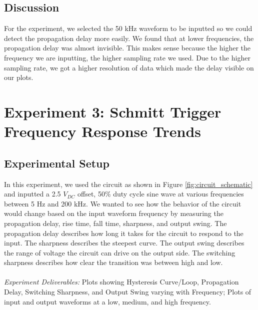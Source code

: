 \documentclass[9pt,a4paper,twoside]{tau-class/tau}
\begin{document}
	\subsection{Discussion}
	For the experiment, we selected the 50 kHz waveform to be inputted so we could detect the propagation delay more easily. We found that at lower frequencies, the propagation delay was almost invisible. This makes sense because the higher the frequency we are inputting, the higher sampling rate we used. Due to the higher sampling rate, we got a higher resolution of data which made the delay visible on our plots.
\section{Experiment 3: Schmitt Trigger Frequency Response Trends}
	\subsection{Experimental Setup}
	In this experiment, we used the circuit as shown in Figure \ref{fig:circuit_schematic} 
	and inputted a 2.5 $V_{DC}$ offset, 50\% duty cycle sine wave at various frequencies between 5 Hz and 200 kHz.
	We wanted to see how the behavior of the circuit would change based on the input waveform frequency by measuring the 
	propagation delay, rise time, fall time, sharpness, and output swing. The propagation delay describes how long it takes 
	for the circuit to respond to the input. The sharpness describes the steepest curve. The output 
	swing describes the range of voltage the circuit can drive on the output side. The switching sharpness describes how clear 
	the transition was between high and low.\\
	\\
	\textit{Experiment Deliverables:} Plots showing Hysteresis Curve/Loop, Propagation Delay, Switching Sharpness, and Output Swing varying with Frequency; Plots of input and output waveforms at a low, medium, and high frequency.
\end{document}
